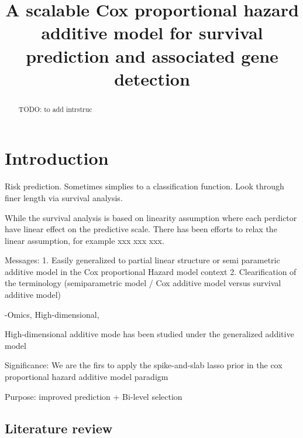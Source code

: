 \documentclass{article}
\title{A scalable Cox proportional hazard additive model for survival
prediction and associated gene detection}
\author{
  }
\begin{document}
\maketitle

\def\tightlist{}


\begin{abstract}
TODO: to add intrstruc
\end{abstract}


\hypertarget{introduction}{%
\section{Introduction}\label{introduction}}

Risk prediction. Sometimes simplies to a classification function. Look
through finer length via survival analysis.

While the survival analysis is based on linearity assumption where each
perdictor have linear effect on the predictive scale. There has been
efforts to relax the linear assumption, for example xxx xxx xxx.

Messages: 1. Easily generalized to partial linear structure or semi
parametric additive model in the Cox proportional Hazard model context
2. Clearification of the terminology (semiparametric model / Cox
additive model versus survival additive model)

-Omics, High-dimensional,

High-dimensional additive mode has been studied under the generalized
additive model

Significance: We are the firs to apply the spike-and-slab lasso prior in
the cox proportional hazard additive model paradigm

Purpose: improved prediction + Bi-level selection

\hypertarget{literature-review}{%
\subsection{Literature review}\label{literature-review}}
\end{document}
